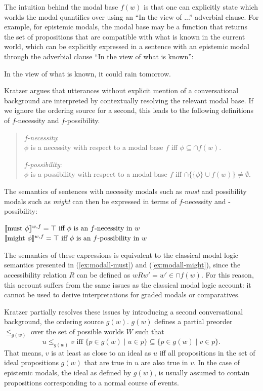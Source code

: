The intuition behind the modal base $f(w)$ is that one can explicitly state which worlds the modal quantifies over using an 
``In the view of ...'' adverbial clause. For example, for epistemic modals, the modal base may be a function that returns the set of propositions
that are compatible with what is known in the current world, which can be explicitly expressed in a sentence with an epistemic modal through the
adverbial clause ``In the view of what is known'':

\begin{exe}
\ex In the view of what is known, it could rain tomorrow.
\end{exe}

\noindent Kratzer argues that utterances without explicit mention of a conversational background are interpreted
by contextually resolving the relevant modal base. If we ignore the ordering source for a second, this leads to the following 
definitions of $f$-necessity and $f$-possibility.

\begin{quote}
\noindent $f$-\textit{necessity}: \\
$\phi$ is a necessity with respect to a modal base $f$ iff $\phi \subseteq \cap f(w)$.

\noindent $f$-\textit{possibility}: \\
$\phi$ is a possibility with respect to a modal base $f$ iff $\cap \{\{\phi\} \cup  f(w) \} \ne \emptyset$.
\end{quote}

The semantics of sentences with necessity modals such as \textit{must} and possibility modals such as \textit{might}
can then be expressed in terms of $f$-necessity and -possibility:

\begin{exe}
\ex $\llbracket\mbox{must }\phi\rrbracket^{w,f} = \top \mbox{ iff $\phi$ is an $f$-necessity in $w$} $
\ex $\llbracket\mbox{might } \phi\rrbracket^{w,f} = \top \mbox{ iff $\phi$ is an $f$-possibility in $w$} $
\end{exe}

The semantics of these expressions is equivalent to the classical modal logic semantics presented in (\ref{ex:modall-must})  and (\ref{ex:modall-might}), 
since the accessibility relation $R$ can be defined as $wRw' = w' \in \cap f(w)$. For this reason, this account suffers from the same
issues as the classical modal logic account: it cannot be used to derive interpretations for graded modals or comparatives.

Kratzer partially resolves these issues by introducing a second conversational background, 
the ordering source $g(w)$. $g(w)$ defines a partial preorder $\le_{g(w)}$ over the set of possible worlds $W$ such that 
$$u \le_{g(w)} v \mbox{ iff } \{ p \in g(w) \mid u \in p \} \subseteq \{ p \in g(w) \mid v \in p \}.$$
That means, $v$ is at least as close to an ideal as $u$ iff all propositions in the set of ideal 
propositions $g(w)$ that are true in $u$ are also true in $v$. In the case of epistemic modals, 
the ideal as defined by $g(w)$, is usually assumed to contain propositions corresponding to a normal course of events.

